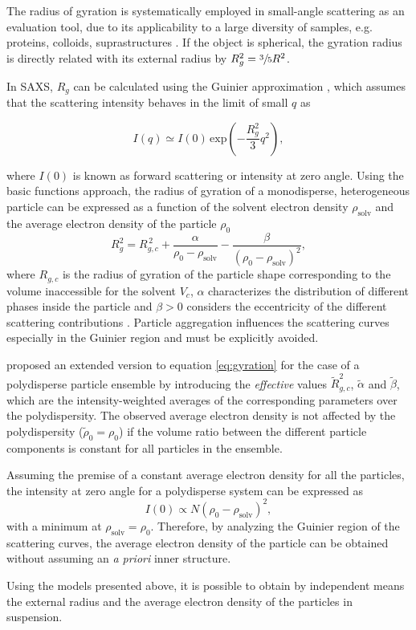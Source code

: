 The radius of gyration is systematically employed in small-angle scattering as an evaluation tool, due to its applicability to a large diversity of samples, e.g. proteins, colloids, suprastructures \citep{mertens_structural_2010,sim_salt_2012}. If the object is spherical, the gyration radius is directly related with its external radius by $R_g^2 = \sfrac{3}{5}R^2$.

In SAXS, $R_g$ can be calculated using the Guinier approximation \citep{guinier_diffraction_1939,guinier_small-angle_1955}, which assumes that the scattering intensity behaves in the limit of small \(q\) as

\begin{equation}
\label{eq:guinier}
I(q) \simeq I(0)\,\mbox{exp}\left(-\frac{R_g^2}{3}q^2\right),
\end{equation}

where \( I(0)\) is known as forward scattering or intensity at zero angle. Using the basic functions approach, the radius of gyration of a monodisperse, heterogeneous particle can be expressed as a function of the solvent electron density \( \rho_{\text{solv}} \) and the average electron density of the particle \( \rho_0 \) \citep{feigin_structure_1987}
\begin{equation}
R_g^2=R_{g,c}^{\,2}+\frac{\alpha}{\rho_0-\rho_{\text{solv}}}-\frac{\beta}{(\rho_0-\rho_{\text{solv}})^2},
\label{eq:gyration}
\end{equation}
where \(R_{g,c}\) is the radius of gyration of the particle shape corresponding to the volume inaccessible for the solvent \( V_c \), \( \alpha \) characterizes the distribution of different phases inside the particle and \( \beta>0 \) considers the eccentricity of the different scattering contributions \citep{stuhrmann_small-angle_2008}. Particle aggregation influences the scattering curves especially in the Guinier region and must be explicitly avoided.

\cite{avdeev_contrast_2007} proposed an extended version to equation \eqref{eq:gyration} for the case of a polydisperse particle ensemble by introducing the \emph{effective} values \( \tilde R^2_{g,c} \), \( \tilde \alpha \) and \( \tilde \beta \), which are the intensity-weighted averages of the corresponding parameters over the polydispersity. The observed average electron density is not affected by the polydispersity (\( \tilde\rho_0=\rho_0 \)) if the volume ratio between the different particle components is constant for all particles in the ensemble.

Assuming the premise of a constant average electron density for all the particles, the intensity at zero angle for a polydisperse system can be expressed as
\begin{equation}
\label{eq:I0}
I(0)\propto N \left( \rho_0-\rho_{\text{solv}} \right)^2 ,
\end{equation}
with a minimum at \( \rho_{\text{solv}}=\rho_0 \). Therefore, by analyzing the Guinier region of the scattering curves, the average electron density of the particle can be obtained without assuming an \emph{a priori} inner structure.

Using the models presented above, it is possible to obtain by independent means the external radius and the average electron density of the particles in suspension.

